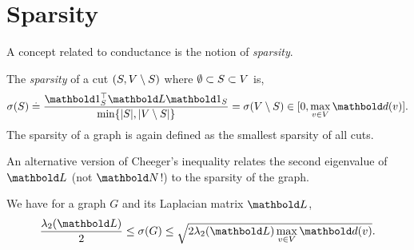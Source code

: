 \section{Sparsity}

A concept related to conductance is the notion of \emph{sparsity}.

\begin{defn}[Sparsity] The \emph{sparsity} of a cut $(S, V \setminus S)$ where $\emptyset \subset S \subset V$ is, \begin{align}
    \sigma(\sS) \defeq \frac{\trans{\vOne_\sS}\mL\vOne_\sS}{\min\{|\sS|, |\sV \setminus \sS|\}} = \sigma(\sV \setminus \sS) \in [0, \max_{v \in \sV} \vd(v)].
\end{align} The sparsity of a graph is again defined as the smallest sparsity of all cuts.
\end{defn}

An alternative version of Cheeger's inequality relates the second eigenvalue of $\mL$ (not $\mN$!) to the sparsity of the graph.

\begin{thm} We have for a graph $G$ and its Laplacian matrix $\mL$, \begin{align}
    \frac{\lambda_2(\mL)}{2} \leq \sigma(G) \leq \sqrt{2 \lambda_2(\mL) \max_{v \in \sV} \vd(v)}.
\end{align}
\end{thm}